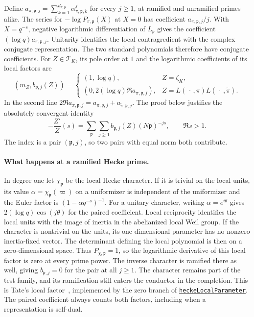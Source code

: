 \documentclass[11pt]{amsart}
\theoremstyle{definition}
\theoremstyle{remark}
\numberwithin{equation}{section}
\newcommand{\repositoryurl}{https://github.com/kimihiro64/Robin1984}
\newcommand{\proofrevision}{b359826e62c50b6cef55db4b2fcab793232498cc}
\newcommand{\codelink}[2]{%
  \href{\repositoryurl/blob/\proofrevision/#1}{\texttt{#2}}}
\begin{document}
Define \(a_{\pi,\mathfrak p,j}=\sum_{k=1}^{d_{\pi,\mathfrak p}}
\alpha_{\pi,\mathfrak p,k}^j\) for every \(j\geq1\), at ramified
and unramified primes alike. The series for
\(-\log P_{\pi,\mathfrak p}(X)\) at \(X=0\) has coefficient
\(a_{\pi,\mathfrak p,j}/j\). With \(X=q^{-s}\), negative
logarithmic differentiation of \(L_{\mathfrak p}\) gives the
coefficient \((\log q)a_{\pi,\mathfrak p,j}\).
Unitarity identifies the local contragredient with the complex
conjugate representation. The two standard polynomials therefore
have conjugate coefficients. For \(Z\in\mathcal T_K\), its pole order at \(1\) and the
logarithmic coefficients of its local factors are
\[
 (m_Z,b_{\mathfrak p,j}(Z))=
 \begin{cases}
 (1,\log q),& Z=\zeta_K,\\
 (0,2(\log q)\Re a_{\pi,\mathfrak p,j}),&
     Z=L(\,\cdot\,,\pi)L(\,\cdot\,,\widetilde\pi).
 \end{cases}
\]
In the second line \(2\Re a_{\pi,\mathfrak p,j}=
a_{\pi,\mathfrak p,j}+a_{\widetilde\pi,\mathfrak p,j}\).
The proof below justifies the absolutely convergent identity
\begin{equation}\label{eq:standard-log-derivative}
 -\frac{Z'}{Z}(s)
   =\sum_{\mathfrak p}\sum_{j\geq1}
      b_{\mathfrak p,j}(Z)(N\mathfrak p)^{-js},
 \qquad \Re s>1 .
\end{equation}
The index is a pair \((\mathfrak p,j)\), so two pairs with equal
norm both contribute.

\paragraph{What happens at a ramified Hecke prime.}
In degree one let \(\chi_{\mathfrak p}\) be the local Hecke
character. If it is trivial on the local units, its value
\(\alpha=\chi_{\mathfrak p}(\varpi)\) on a uniformizer is
independent of the uniformizer and the Euler factor is
\((1-\alpha q^{-s})^{-1}\). For a unitary character, writing
\(\alpha=e^{i\theta}\) gives \(2(\log q)\cos(j\theta)\)
for the paired coefficient. Local reciprocity identifies the
local units with the image of inertia in the abelianized
local Weil group. If the character is nontrivial on the units,
its one-dimensional parameter has no nonzero inertia-fixed
vector. The determinant defining the local polynomial is then
on a zero-dimensional space.
Thus \(P_{\chi,\mathfrak p}=1\), so the logarithmic derivative
of this local factor is zero at every prime power. The inverse
character is ramified there as well, giving
\(b_{\mathfrak p,j}=0\) for the pair at all \(j\ge1\).
The character remains part of the test family, and its
ramification still enters the conductor in the completion.
This is Tate's local factor~\cite{Tate1967}, implemented by the
zero branch of
\codelink{Robin1984/GRH/HeckeEulerProduct.lean\#L228-L242}{heckeLocalParameter}.
The paired coefficient always counts both factors, including
when a representation is self-dual.
\end{document}
